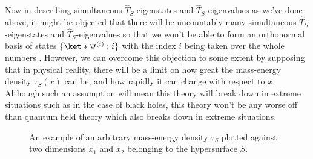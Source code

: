 \documentclass[12pt]{report}
\providecommand{\DIFadd}[1]{{\protect\color{blue}\uwave{#1}}} %
\providecommand{\DIFdel}[1]{{\protect\color{red}\sout{#1}}}                      %
\providecommand{\DIFaddbegin}{} %
\providecommand{\DIFaddend}{} %
\providecommand{\DIFdelbegin}{} %
\providecommand{\DIFdelend}{} %
\providecommand{\DIFaddbeginFL}{} %
\providecommand{\DIFaddendFL}{} %
\providecommand{\DIFdelbeginFL}{} %
\providecommand{\DIFdelendFL}{} %
\begin{document}
Now in describing simultaneous $\hat{T}_S$-eigenstates and  $\hat{T}_S$-eigenvalues as we've done above, it might be objected that there will be uncountably many simultaneous $\hat{T}_S$-eigenstates and  $\hat{T}_S$-eigenvalues so that we won't be able to form an orthonormal basis of states \DIFdelbegin \DIFdel{$\{\ket*{\Psi^{(i)}}:i\}$ }\DIFdelend \DIFaddbegin \DIFadd{$\{\ket*{\Gamma_{i}}:i\in\mathbb{N}\}$ }\DIFaddend with the index $i$ being taken over the whole numbers \DIFaddbegin \DIFadd{greater than $0$}\DIFaddend . However, we can overcome this objection to some extent by supposing that in physical reality, there will be a limit on how great the mass-energy density $\tau_S(x)$ can be, and how rapidly it can change with respect to $x$. Although such an assumption will mean this theory will break down in extreme situations such as in the case of black holes, this theory won't be any worse off than quantum field theory which also breaks down in extreme situations.
\begin{figure}[ht!]
  \captionsetup{justification=justified}
  \centering

  \vspace*{2px}
  \DIFdelbeginFL %
\DIFdelendFL \DIFaddbeginFL \caption[Example of an arbitrary mass-energy density]{\DIFaddendFL An example of an arbitrary mass-energy density $\tau_S$ plotted against two dimensions $x_1$ and $x_2$ belonging to the hypersurface $S$. }\label{tauSexample}
  \end{figure}
\end{document}
